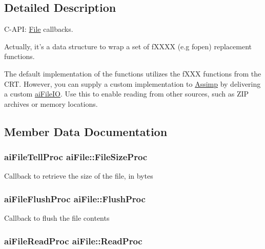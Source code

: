 \subsection{Detailed Description}
C-\/\+A\+P\+I\+: \hyperlink{class_file}{File} callbacks. 

Actually, it's a data structure to wrap a set of f\+X\+X\+X\+X (e.\+g fopen) replacement functions.

The default implementation of the functions utilizes the f\+X\+X\+X functions from the C\+R\+T. However, you can supply a custom implementation to \hyperlink{class_assimp}{Assimp} by delivering a custom \hyperlink{structai_file_i_o}{ai\+File\+I\+O}. Use this to enable reading from other sources, such as Z\+I\+P archives or memory locations. 

\subsection{Member Data Documentation}
\hypertarget{structai_file_aff2fff8c0458e7ec71f7de217c3a3033}{
\subsubsection[{File\+Size\+Proc}]{\setlength{\rightskip}{0pt plus 5cm}ai\+File\+Tell\+Proc ai\+File\+::\+File\+Size\+Proc}}\label{structai_file_aff2fff8c0458e7ec71f7de217c3a3033}
Callback to retrieve the size of the file, in bytes \hypertarget{structai_file_a1102d28d1c0be68ffed20476669bdb0d}{
\subsubsection[{Flush\+Proc}]{\setlength{\rightskip}{0pt plus 5cm}ai\+File\+Flush\+Proc ai\+File\+::\+Flush\+Proc}}\label{structai_file_a1102d28d1c0be68ffed20476669bdb0d}
Callback to flush the file contents \hypertarget{structai_file_a52287e81ca67b9d43cc1ce6142f781fa}{
\subsubsection[{Read\+Proc}]{\setlength{\rightskip}{0pt plus 5cm}ai\+File\+Read\+Proc ai\+File\+::\+Read\+Proc}}\label{structai_file_a52287e81ca67b9d43cc1ce6142f781fa}

